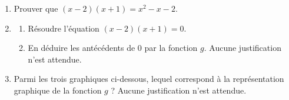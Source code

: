 \documentclass[11pt]{article}
\begin{document}
\begin{enumerate}
	\item Prouver que $(x-2)(x+1)=x^{2}-x-2$.

	\item \begin{enumerate}
		\item Résoudre l'équation $(x-2)(x+1)=0$.
		\item En déduire les antécédents de 0 par la fonction $g$. Aucune justification n'est attendue.
	\end{enumerate}


	\item Parmi les trois graphiques ci-dessous, lequel correspond à la représentation graphique de la fonction $g$ ? Aucune justification n'est attendue.


\end{enumerate}
\end{document}
